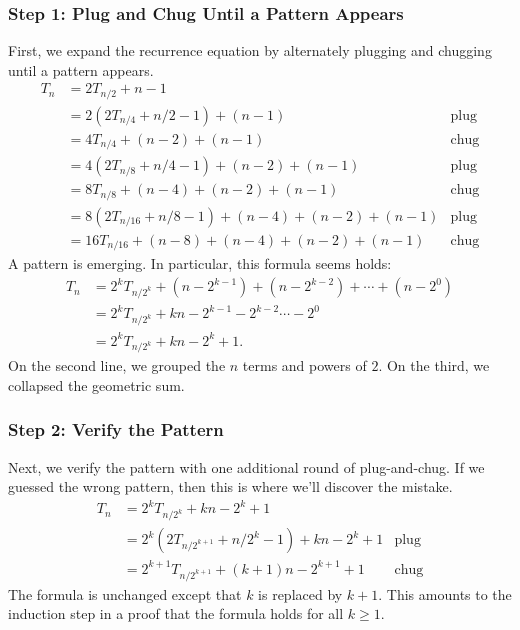 \subsubsection*{Step 1: Plug and Chug Until a Pattern Appears}

First, we expand the recurrence equation by alternately plugging and
chugging until a pattern appears.
\begin{align*}
T_n & = 2T_{n/2} + n - 1 \\
  & = 2 (2 T_{n/4} + n/2 - 1)  + (n - 1) & \text{plug} \\
  & = 4 T_{n/4} + (n - 2) + (n - 1) & \text{chug} \\
  & = 4 (2 T_{n/8} + n / 4 - 1) + (n - 2) + (n - 1) & \text{plug} \\
  & = 8 T_{n/8} + (n - 4) + (n - 2) + (n - 1) & \text{chug} \\
  & = 8 (2 T_{n/16} + n / 8 - 1) +  (n - 4) + (n - 2) + (n - 1) &
  \text{plug} \\
  & = 16 T_{n/16} + (n - 8) + (n - 4) + (n - 2) + (n - 1) & \text{chug}
\end{align*}
A pattern is emerging.  In particular, this formula seems holds:
\begin{align*}
T_n & = 2^k T_{n/2^k} + (n - 2^{k-1}) + (n - 2^{k -2}) + \cdots + (n -
2^0) \\
  & = 2^k T_{n/2^k} + k n - 2^{k-1}  - 2^{k-2} \cdots - 2^0 \\
  & = 2^k T_{n/2^k} + k n - 2^k + 1.
\end{align*}
On the second line, we grouped the $n$ terms and powers of $2$.  On
the third, we collapsed the geometric sum.

\subsubsection*{Step 2:  Verify the Pattern}

Next, we verify the pattern with one additional round of
plug-and-chug.  If we guessed the wrong pattern, then this is where
we'll discover the mistake.
\begin{align*}
T_n & = 2^k T_{n/2^k} + k n - 2^k + 1 \\
 & = 2^k (2 T_{n/2^{k+1}} + n/2^k - 1) + kn - 2^k + 1 & \text{plug} \\
 & = 2^{k+1} T_{n/2^{k+1}}  + (k+ 1) n - 2^{k+1} + 1 & \text{chug}
\end{align*}
The formula is unchanged except that $k$ is replaced by $k+1$.  This
amounts to the induction step in a proof that the formula holds for
all $k \geq 1$.

